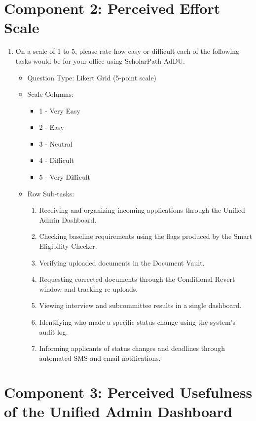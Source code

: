 \section{Component 2: Perceived Effort Scale}

\begin{enumerate}[resume=q, label={Question \arabic*:}, leftmargin=*, align=left]
  \item On a scale of 1 to 5, please rate how easy or difficult each of the following tasks would be for your office using ScholarPath AdDU.
  \begin{itemize}[leftmargin=*]
    \item Question Type: Likert Grid (5-point scale)
    \item Scale Columns:
    \begin{itemize}[leftmargin=*]
      \item 1 - Very Easy
      \item 2 - Easy
      \item 3 - Neutral
      \item 4 - Difficult
      \item 5 - Very Difficult
    \end{itemize}
    \item Row Sub-tasks:
    \begin{enumerate}[label=\arabic*., leftmargin=*]
      \item Receiving and organizing incoming applications through the Unified Admin Dashboard.
      \item Checking baseline requirements using the flags produced by the Smart Eligibility Checker.
      \item Verifying uploaded documents in the Document Vault.
      \item Requesting corrected documents through the Conditional Revert window and tracking re-uploads.
      \item Viewing interview and subcommittee results in a single dashboard.
      \item Identifying who made a specific status change using the system's audit log.
      \item Informing applicants of status changes and deadlines through automated SMS and email notifications.
    \end{enumerate}
  \end{itemize}
\end{enumerate}

\section{Component 3: Perceived Usefulness of the Unified Admin Dashboard}

